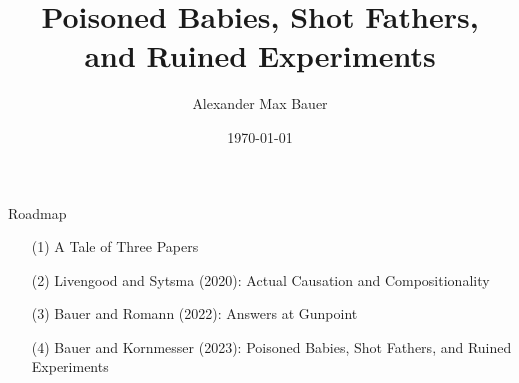 \documentclass[xcolor=table,9pt,aspectratio=169]{beamer}
\title{Poisoned Babies, Shot Fathers,\\and Ruined Experiments}
\subtitle{}
\author{Alexander Max Bauer}
\date{\renewcommand{\dateseparator}{.}\ddmmyyyydate\today}
\begin{document}
{
\begin{frame}
   \maketitle
\end{frame}
}


\begin{frame}{\vspace*{10mm}Roadmap}
\vspace*{-5mm}
\begin{itemize}
   \item[(1)] A Tale of Three Papers
   \item[(2)] Livengood and Sytsma (2020): Actual Causation and Compositionality
   \item[(3)] Bauer and Romann (2022): Answers at Gunpoint
   \item[(4)] Bauer and Kornmesser (2023): Poisoned Babies, Shot Fathers, and Ruined Experiments
\end{itemize}
\end{frame}
\end{document}
